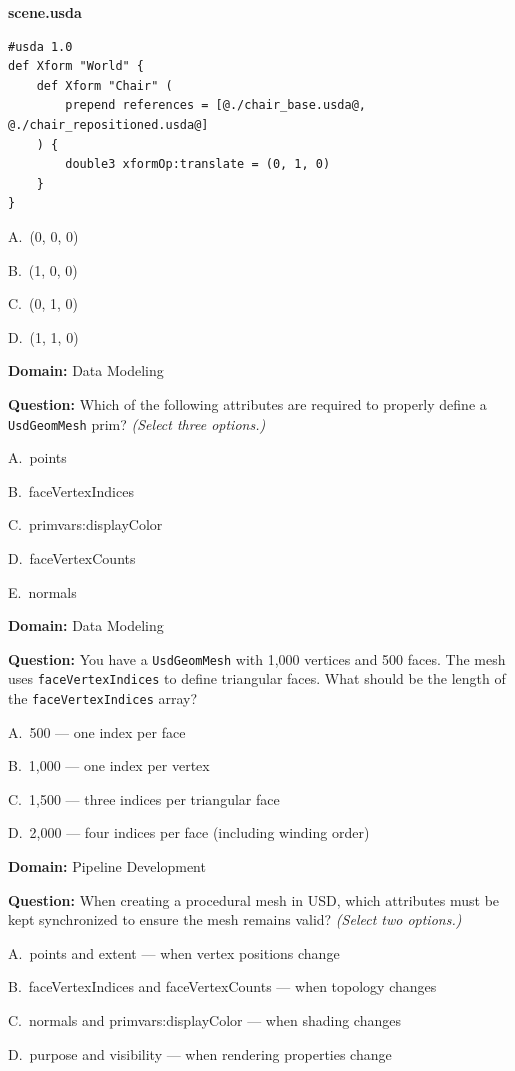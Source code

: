 \noindent\textbf{scene.usda}
\begin{lstlisting}
#usda 1.0
def Xform "World" {
    def Xform "Chair" (
        prepend references = [@./chair_base.usda@, @./chair_repositioned.usda@]
    ) {
        double3 xformOp:translate = (0, 1, 0)
    }
}
\end{lstlisting}

\begin{Choices}
  \item A.\ (0, 0, 0)
  \item B.\ (1, 0, 0)
  \item C.\ (0, 1, 0)
  \item D.\ (1, 1, 0)
\end{Choices}

\noindent\textbf{Domain:} Data Modeling\par
\vspace{0.4em}
\noindent\textbf{Question:} Which of the following attributes are required to properly define a \texttt{UsdGeomMesh} prim? \textit{(Select three options.)}
\begin{Choices}
  \item A.\ points
  \item B.\ faceVertexIndices
  \item C.\ primvars:displayColor
  \item D.\ faceVertexCounts
  \item E.\ normals
\end{Choices}

\noindent\textbf{Domain:} Data Modeling\par
\vspace{0.4em}
\noindent\textbf{Question:} You have a \texttt{UsdGeomMesh} with 1,000 vertices and 500 faces. The mesh uses \texttt{faceVertexIndices} to define triangular faces. What should be the length of the \texttt{faceVertexIndices} array?
\begin{Choices}
  \item A.\ 500 — one index per face
  \item B.\ 1,000 — one index per vertex
  \item C.\ 1,500 — three indices per triangular face
  \item D.\ 2,000 — four indices per face (including winding order)
\end{Choices}

\noindent\textbf{Domain:} Pipeline Development\par
\vspace{0.4em}
\noindent\textbf{Question:} When creating a procedural mesh in USD, which attributes must be kept synchronized to ensure the mesh remains valid? \textit{(Select two options.)}
\begin{Choices}
  \item A.\ points and extent — when vertex positions change
  \item B.\ faceVertexIndices and faceVertexCounts — when topology changes
  \item C.\ normals and primvars:displayColor — when shading changes
  \item D.\ purpose and visibility — when rendering properties change
\end{Choices}

